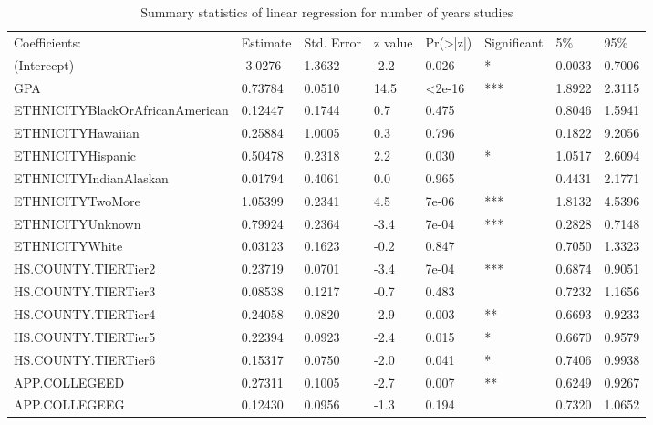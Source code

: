 \documentclass[12pt,english]{report}
\begin{document}
\begin{table}[H]
\centering
\caption{Summary statistics of linear regression for number of years studies }
\label{LR_num_years}
\begin{adjustbox}{width=0.95\textwidth}
\begin{tabular}{|llllllll|} \hline \hline
Coefficients:                   & Estimate & Std. Error & z value & Pr(\textgreater|z|) & Significant & 5\%    & 95\%   \\

(Intercept)                    &  -3.0276 & 1.3632  & -2.2  &  0.026 & *  &0.0033 & 0.7006 \\  
GPA                            &  0.73784 & 0.0510  & 14.5  & <2e-16 & ***&1.8922 & 2.3115 \\
ETHNICITYBlackOrAfricanAmerican&  0.12447 & 0.1744  &  0.7  &  0.475 &    &0.8046 & 1.5941 \\
ETHNICITYHawaiian              &  0.25884 & 1.0005 &   0.3  &  0.796 &    &0.1822 & 9.2056 \\
ETHNICITYHispanic              &  0.50478 & 0.2318 &   2.2  &  0.030 & *  &1.0517 & 2.6094 \\
ETHNICITYIndianAlaskan         &  0.01794 & 0.4061 &   0.0  &  0.965 &    &0.4431 & 2.1771 \\
ETHNICITYTwoMore               &  1.05399 & 0.2341 &   4.5  &  7e-06 & ***&1.8132 & 4.5396 \\
ETHNICITYUnknown               &  0.79924 & 0.2364 &  -3.4  &  7e-04 & ***&0.2828 & 0.7148 \\
ETHNICITYWhite                 &  0.03123 & 0.1623 &  -0.2  &  0.847 &    &0.7050 & 1.3323 \\
HS.COUNTY.TIERTier2            &  0.23719 & 0.0701 &  -3.4  &  7e-04 & ***&0.6874 & 0.9051 \\
HS.COUNTY.TIERTier3            &  0.08538 & 0.1217 &  -0.7  &  0.483 &    &0.7232 & 1.1656 \\
HS.COUNTY.TIERTier4            &  0.24058 & 0.0820 &  -2.9  &  0.003 & ** &0.6693 & 0.9233 \\
HS.COUNTY.TIERTier5            &  0.22394 & 0.0923 &  -2.4  &  0.015 & *  &0.6670 & 0.9579 \\
HS.COUNTY.TIERTier6            &  0.15317 & 0.0750 &  -2.0  &  0.041 & *  &0.7406 & 0.9938 \\
APP.COLLEGEED                  &  0.27311 & 0.1005 &  -2.7  &  0.007 & ** &0.6249 & 0.9267 \\
APP.COLLEGEEG                  &  0.12430 & 0.0956 &  -1.3  &  0.194 &    &0.7320 & 1.0652 \\

\end{tabular}
\end{adjustbox}
\end{table}
\end{document}
